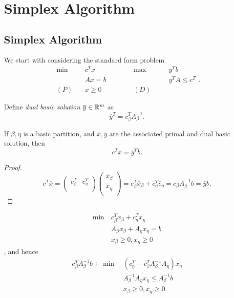 \section{Simplex Algorithm}
\subsection{Simplex Algorithm}
We start with considering the standard form problem
\[
	\begin{alignedat}{5}
		\min~&c^{T}x\qquad\qquad &&\max ~ &&y^{T}b\\
		&Ax = b && &&y^{T}A\leq c^{T}\\
		(P)\quad&x\geq  0 &&(D)\quad&&
	\end{alignedat}.
\]

\begin{definition}
	Define \emph{dual basic solution} \(\overline{y}\in \mathbb{\MakeUppercase{R}}^m\) as
	\[
		\overline{y}^{T} = c_{\beta}^{T} A^{-1}_{\beta}.
	\]
\end{definition}

\begin{lemma}
	If \(\beta, \eta\) is a basic partition, and \(\overline{x}, \overline{y}\) are the associated primal and dual basic solution,
	then
	\[
		c^{T}\overline{x} = \overline{y}^{T} b.
	\]
\end{lemma}
\begin{proof}
	\[
		c^{T}\overline{x} = \begin{pmatrix}
			c^{T}_{\beta} & c^{T}_{\eta} \\
		\end{pmatrix}\begin{pmatrix}
			\overline{x}_{\beta} \\
			\overline{x}_{\eta}  \\
		\end{pmatrix}= c_{\beta}^{T} \overline{x}_{\beta}+ c_{\eta}^{T} \overline{c}_{\eta} = c_{\beta} A^{-1}_{\beta}b = \overline{y}b.
	\]
\end{proof}

\begin{prev}
	\begin{align*}
		\min~ & c^{T}_{\beta}x_{\beta} + c^{T}_{\eta}x_{\eta} \\
		      & A_{\beta}x_{\beta} + A_{\eta}x_{\eta} = b     \\
		      & x_{\beta}\geq 0, x_{\eta}\geq 0
	\end{align*}, and hence
	\begin{align*}
		c^{T}_{\beta}A^{-1}_{\beta}b + \min~ & (c_{\eta}^{T} - c_{\beta}^{T}A^{-1}_{\beta}A_{\eta})x_{\eta} \\
		                                     & A^{-1}_{\beta}A_{\eta}x_{\eta} \leq A^{-1}_{\beta}b          \\
		                                     & x_{\beta}\geq 0, x_{\eta}\geq 0.
	\end{align*}
\end{prev}

